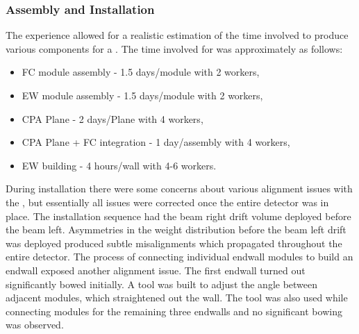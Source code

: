\subsubsection{Assembly and Installation}
\label{sec:fdsp-hv-protodune-lessons-assy}
The  experience allowed for a realistic estimation of the time involved to produce various  components for a .
The time involved for  was approximately as follows:
\begin{itemize}
\item FC module assembly - 1.5 days/module with 2 workers,
\item EW module assembly - 1.5 days/module with 2 workers,
\item CPA Plane - 2 days/Plane with 4 workers,
\item CPA Plane + FC integration - 1 day/assembly with 4 workers,
\item EW building - 4 hours/wall with 4-6 workers.
\end{itemize}
During installation there were some concerns about various alignment issues with the , but essentially all issues were corrected once the entire detector was in place.
The  installation sequence had the beam right drift volume deployed before the beam left.
Asymmetries in the weight distribution before the beam left drift was deployed produced subtle misalignments which propagated throughout the entire detector.
The process of connecting individual endwall modules to build an endwall exposed another alignment issue.
The first endwall turned out significantly bowed initially.
A tool was built to adjust the angle between adjacent modules, which straightened out the wall.
The tool was also used while connecting modules for the remaining three endwalls and no significant bowing was observed.



